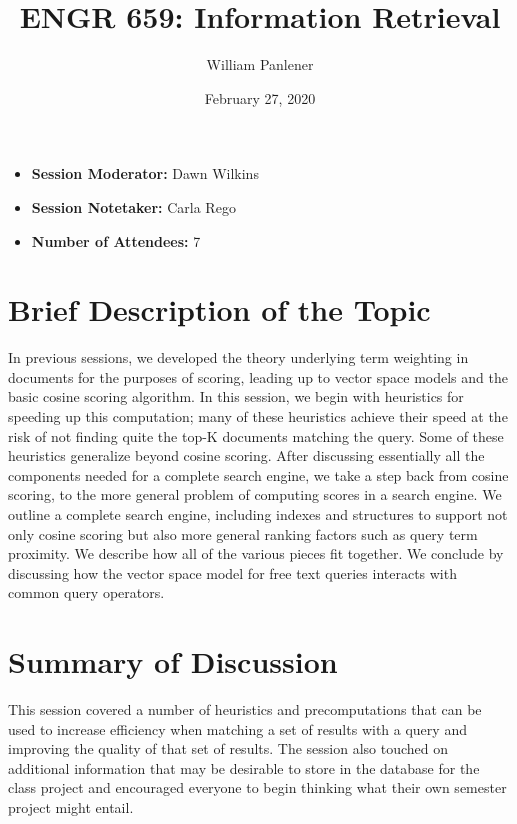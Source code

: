 \documentclass{article}
\title{ENGR 659: Information Retrieval}
\author{William Panlener}
\date{February 27, 2020}
\begin{document}
\maketitle

\begin{itemize}[leftmargin=*,noitemsep]
  \item[] \textbf{Session Moderator: } Dawn Wilkins
  \item[] \textbf{Session Notetaker: } Carla Rego
  \item[] \textbf{Number of Attendees: } 7
\end{itemize}




\section{Brief Description of the Topic}

In previous sessions, we developed the theory underlying term weighting in documents for the purposes of scoring, leading up to vector space models and the basic cosine scoring algorithm. In this session, we begin with heuristics for speeding up this computation; many of these heuristics achieve their speed at the risk of not finding quite the top-K documents matching the query. Some of these heuristics generalize beyond cosine scoring. After discussing essentially all the components needed for a complete search engine, we take a step back from cosine scoring, to the more general problem of computing scores in a search engine. We outline a complete search engine, including indexes and structures to support not only cosine scoring but also more general ranking factors such as query term proximity. We describe how all of the various pieces fit together. We conclude by discussing how the vector space model for free text queries interacts with common query operators.

\section{Summary of Discussion}

This session covered a number of heuristics and precomputations that can be used to increase efficiency when matching a set of results with a query and improving the quality of that set of results. The session also touched on additional information that may be desirable to store in the database for the class project and encouraged everyone to begin thinking what their own semester project might entail.
\end{document}
